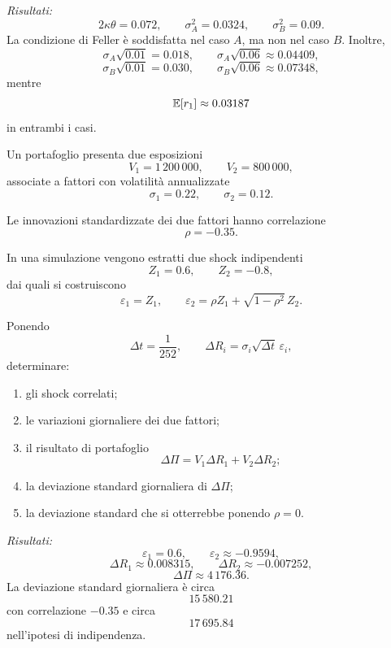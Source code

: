 \noindent
\textit{Risultati:}
\[
2\kappa\theta=0.072,
\qquad
\sigma_A^2=0.0324,
\qquad
\sigma_B^2=0.09.
\]
La condizione di Feller \`{e} soddisfatta nel caso $A$, ma non nel
caso $B$. Inoltre,
\[
\sigma_A\sqrt{0.01}=0.018,
\qquad
\sigma_A\sqrt{0.06}\approx0.04409,
\]
\[
\sigma_B\sqrt{0.01}=0.030,
\qquad
\sigma_B\sqrt{0.06}\approx0.07348,
\]
mentre
\[
\mathbb{E}[r_1]\approx0.03187
\]
in entrambi i casi.


\begin{exercise}
\label{ex:cap06-proposto-portafoglio-correlato}

Un portafoglio presenta due esposizioni
\[
V_1=1\,200\,000,
\qquad
V_2=800\,000,
\]
associate a fattori con volatilit\`{a} annualizzate
\[
\sigma_1=0.22,
\qquad
\sigma_2=0.12.
\]

Le innovazioni standardizzate dei due fattori hanno correlazione
\[
\rho=-0.35.
\]

In una simulazione vengono estratti due shock indipendenti
\[
Z_1=0.6,
\qquad
Z_2=-0.8,
\]
dai quali si costruiscono
\[
\varepsilon_1=Z_1,
\qquad
\varepsilon_2
=
\rho Z_1+\sqrt{1-\rho^2}\,Z_2.
\]

Ponendo
\[
\Delta t=\frac{1}{252},
\qquad
\Delta R_i=\sigma_i\sqrt{\Delta t}\,\varepsilon_i,
\]
determinare:

\begin{enumerate}
\item gli shock correlati;
\item le variazioni giornaliere dei due fattori;
\item il risultato di portafoglio
\[
\Delta\Pi
=
V_1\Delta R_1+V_2\Delta R_2;
\]
\item la deviazione standard giornaliera di $\Delta\Pi$;
\item la deviazione standard che si otterrebbe ponendo $\rho=0$.
\end{enumerate}

\end{exercise}

\noindent
\textit{Risultati:}
\[
\varepsilon_1=0.6,
\qquad
\varepsilon_2\approx-0.9594,
\]
\[
\Delta R_1\approx0.008315,
\qquad
\Delta R_2\approx-0.007252,
\]
\[
\Delta\Pi\approx4\,176.36.
\]
La deviazione standard giornaliera \`{e} circa
\[
15\,580.21
\]
con correlazione $-0.35$ e circa
\[
17\,695.84
\]
nell'ipotesi di indipendenza.



